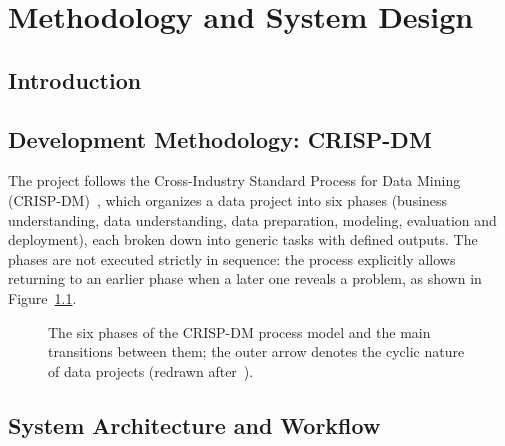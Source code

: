 \chapter{Methodology and System Design}
\label{chap:methodology}

\section{Introduction}

\section{Development Methodology: CRISP-DM}
\label{sec:crispdm}
The project follows the Cross-Industry Standard Process for Data Mining
(CRISP-DM)~\cite{chapman2000crisp,wirth2000crisp}, which organizes a data
project into six phases (business understanding, data understanding, data
preparation, modeling, evaluation and deployment), each broken down into
generic tasks with defined outputs. The phases are not executed strictly in
sequence: the process explicitly allows returning to an earlier phase when a
later one reveals a problem, as shown in Figure~\ref{fig:crispdm-cycle}.


\begin{figure}[htbp]
  \centering
  
  \caption[The CRISP-DM process model]{The six phases of the CRISP-DM process
    model and the main transitions between them; the outer arrow denotes the
    cyclic nature of data projects (redrawn after~\cite{chapman2000crisp}).}
  \label{fig:crispdm-cycle}
\end{figure}



\section{System Architecture and Workflow}


